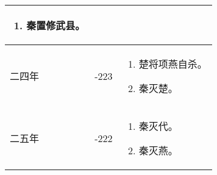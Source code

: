 \begin{longtable}{|>{\centering\scriptsize}m{2em}|>{\centering\scriptsize}m{1.3em}|>{\centering}m{8.8em}|}
\begin{enumerate}
  \item 秦置修武县。
  \end{enumerate} \tabularnewline\hline
  二四年 & -223 & \begin{enumerate}
    \tiny
  \item 楚将项燕自杀。
  \item 秦灭楚。
  \end{enumerate} \tabularnewline\hline
  二五年 & -222 & \begin{enumerate}
    \tiny
  \item 秦灭代。
  \item 秦灭燕。
  \end{enumerate} \tabularnewline
  \bottomrule
\end{longtable}

